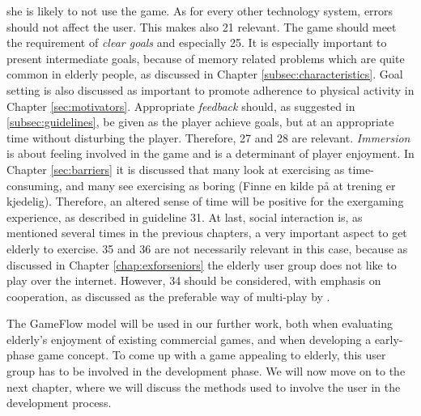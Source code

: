 she is likely to not use the game. As for every other technology system, errors should not affect the user. This makes also 21 relevant. The game should meet the requirement of \emph{clear goals} and especially 25. It is especially important to present intermediate goals, because of memory related problems which are quite common in elderly people, as discussed in Chapter \ref{subsec:characteristics}. Goal setting is also discussed as important to promote adherence to physical activity in Chapter \ref{sec:motivators}. Appropriate \emph{feedback} should, as suggested in \ref{subsec:guidelines}, be given as the player achieve goals, but at an appropriate time without disturbing the player. Therefore, 27 and 28 are relevant. \emph{Immersion} is about feeling involved in the game and is a determinant of player enjoyment. In Chapter \ref{sec:barriers} it is discussed that many look at exercising as time-consuming, and many see exercising as boring (Finne en kilde på at trening er kjedelig). Therefore, an altered sense of time will be positive for the exergaming experience, as described in guideline 31. At last, social interaction is, as mentioned several times in the previous chapters, a very important aspect to get elderly to exercise. 35 and 36 are not necessarily relevant in this case, because as discussed in Chapter \ref{chap:exforseniors} the elderly user group does not like to play over the internet. However, 34 should be considered, with emphasis on cooperation, as discussed as the preferable way of multi-play by \cite{Gajadhar}.

The GameFlow model will be used in our further work, both when evaluating elderly's enjoyment of existing commercial games, and when developing a early-phase game concept. To come up with a game appealing to elderly, this user group has to be involved in the development phase. We will now move on to the next chapter, where we will discuss the methods used to involve the user in the development process.

